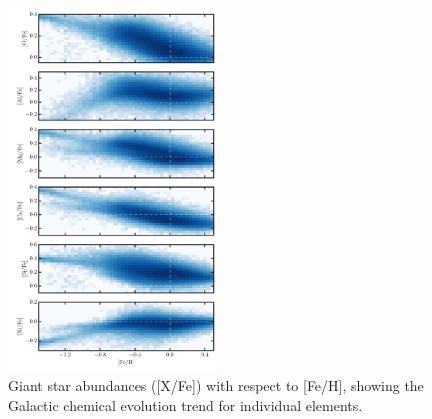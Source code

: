 \documentclass[preprint,trackchanges]{aastex}
\begin{document}
\begin{figure}[p]
\includegraphics[width=0.5\textwidth]{figures/gce.pdf}
\caption{Giant star abundances ([X/Fe]) with respect to [Fe/H], showing the Galactic chemical evolution trend for individual elements.\label{fig:gce}}
\end{figure}
\end{document}
